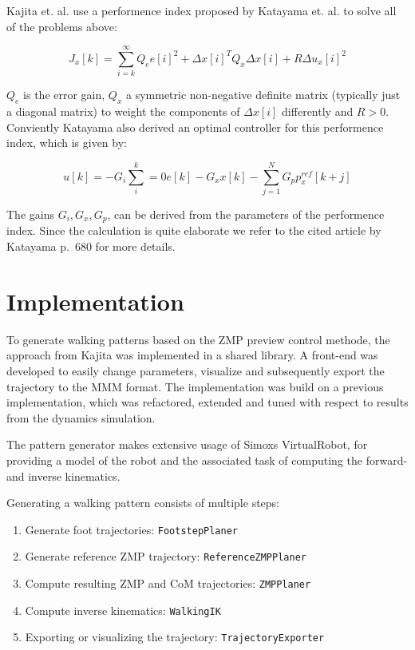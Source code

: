 \documentclass[english,ngerman]{KITreprt}
\newcommand{\clr}[2]{{\color{#1}{#2}}}
\newcommand{\todo}[1]{\marginpar{\clr{red}{#1}}}
\begin{document}
\todo{add citation katayama} Kajita et. al. use a performence index
proposed by Katayama et. al. to solve all of the problems above:

\begin{equation}
J_x[k] = \sum^{\infty}_{i=k} Q_e e[i]^2 + \Delta x[i]^T Q_x \Delta x[i] + R \Delta u_x[i]^2
\end{equation}

$Q_e$ is the error gain, $Q_x$ a symmetric non-negative definite matrix
(typically just a diagonal matrix) to weight the components of
$\Delta x[i]$ differently and $R > 0$. Conviently Katayama also derived
an optimal controller for this performence index, which is given by:

\begin{equation}
u[k] = -G_i \sum^k_i=0 e[k] - G_x x[k] - \sum^N_{j=1} G_p p^{ref}_x[k + j]
\end{equation}

The gains $G_i, G_x, G_p$, can be derived from the parameters of the
performence index. Since the calculation is quite elaborate we refer to
the cited article by Katayama p.~680 for more details.

\section{Implementation}\label{implementation}

\todo{block diagramm of architechture} To generate walking patterns
based on the ZMP preview control methode, the approach from Kajita was
implemented in a shared library. A front-end was developed to easily
change parameters, visualize and subsequently export the trajectory to
the MMM format. The implementation was build on a previous
implementation, which was refactored, extended and tuned with respect to
results from the dynamics simulation.

The pattern generator makes extensive usage of Simoxs VirtualRobot, for
providing a model of the robot and the associated task of computing the
forward- and inverse kinematics.

Generating a walking pattern consists of multiple steps:

\begin{enumerate}
\def\labelenumi{\arabic{enumi}.}
\item
  Generate foot trajectories: \texttt{FootstepPlaner}
\item
  Generate reference ZMP trajectory: \texttt{ReferenceZMPPlaner}
\item
  Compute resulting ZMP and CoM trajectories: \texttt{ZMPPlaner}
\item
  Compute inverse kinematics: \texttt{WalkingIK}
\item
  Exporting or visualizing the trajectory: \texttt{TrajectoryExporter}
\end{enumerate}
\end{document}
